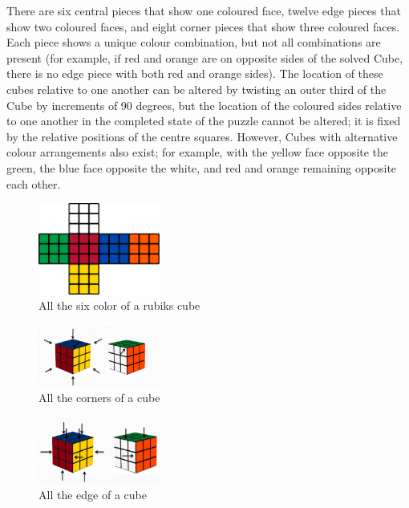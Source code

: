 \documentclass{article}
\begin{document}
There are six central pieces that show one coloured face, twelve edge pieces that show two coloured faces, and eight corner pieces that show three coloured faces. Each piece shows a unique colour combination, but not all combinations are present (for example, if red and orange are on opposite sides of the solved Cube, there is no edge piece with both red and orange sides). The location of these cubes relative to one another can be altered by twisting an outer third of the Cube by increments of 90 degrees, but the location of the coloured sides relative to one another in the completed state of the puzzle cannot be altered; it is fixed by the relative positions of the centre squares. However, Cubes with alternative colour arrangements also exist; for example, with the yellow face opposite the green, the blue face opposite the white, and red and orange remaining opposite each other.
\begin{figure}[h!]
    \centering
    \includegraphics[width=4cm]{330px-Rubik's_cube_colors.svg.png}
    \caption{All the six color of a rubiks cube}
    \label{fig:Rubiks Cube}
\end{figure}
\begin{figure}[h!]
    \centering
    \includegraphics[width=4cm]{Screenshot 2023-07-05 230818.png}
    \caption{All the corners of a cube}
    \label{fig:Rubiks Cube}
\end{figure}
\begin{figure}[h!]
    \centering
    \includegraphics[width=4cm]{Screenshot 2023-07-05 230948.png}
    \caption{All the edge of a cube}
    \label{fig:Rubiks Cube}
\end{figure}\\
\end{document}
